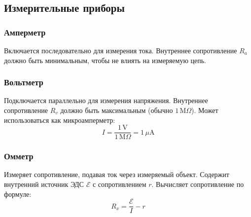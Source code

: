 \documentclass{article}
\begin{document}
\subsection*{Измерительные приборы}

\subsubsection*{Амперметр}
Включается последовательно для измерения тока. Внутреннее сопротивление $R_a$ должно быть минимальным, чтобы не влиять на измеряемую цепь.

\subsubsection*{Вольтметр}
Подключается параллельно для измерения напряжения. Внутреннее сопротивление $R_v$ должно быть максимальным (обычно $1\,\text{M}\Omega$). Может использоваться как микроамперметр:
\[
I = \frac{1\,\text{V}}{1\,\text{M}\Omega} = 1\,\mu\text{A}
\]

\subsubsection*{Омметр}
Измеряет сопротивление, подавая ток через измеряемый объект. Содержит внутренний источник ЭДС $\mathscr{E}$ с сопротивлением $r$. Вычисляет сопротивление по формуле:
\[
R_x = \frac{\mathscr{E}}{I} - r
\]
\end{document}
